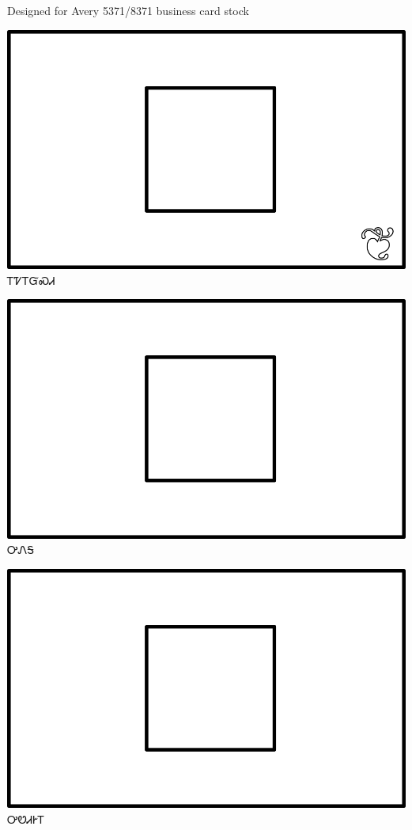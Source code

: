 \documentclass[avery5371]{flashcards}%
\begin{document}
Designed for Avery 5371/8371 business card stock


\begin{flashcard}{
\includegraphics[width=0.95\columnwidth,height=.51\columnwidth,keepaspectratio]{../artwork/for-colors/square-white-with-leaf}
}\Huge ᎢᏤᎢᏳᏍᏗ
\end{flashcard}

\begin{flashcard}{
\includegraphics[width=0.95\columnwidth,height=.51\columnwidth,keepaspectratio]{../artwork/for-colors/square-white}
}\Huge ᎤᏁᎦ
\end{flashcard}

\begin{flashcard}{
\includegraphics[width=0.95\columnwidth,height=.51\columnwidth,keepaspectratio]{../artwork/for-colors/square-white}
}\Huge ᎤᏬᏗᎨᎢ
\end{flashcard}
\end{document}
